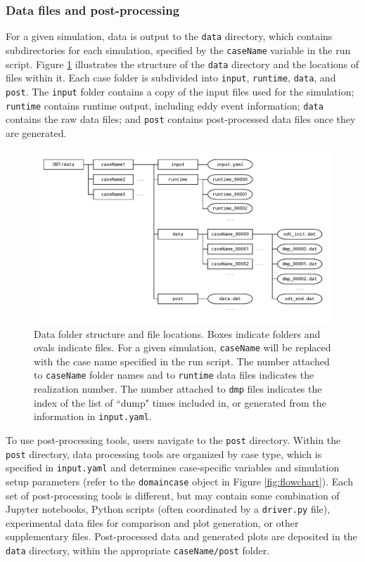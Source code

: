 \documentclass[preprint,12pt, a4paper]{elsarticle}
\begin{document}
\subsubsection{Data files and post-processing}
\label{sec:data_files_post_processing}

For a given simulation, data is output to the \texttt{data} directory, which contains subdirectories for each simulation, specified by the \texttt{caseName} variable in the run script. Figure \ref{fig:data_folder_structure} illustrates the structure of the \texttt{data} directory and the locations of files within it. Each case folder is subdivided into \texttt{input}, \texttt{runtime}, \texttt{data}, and \texttt{post}. The \texttt{input} folder contains a copy of the input files used for the simulation; \texttt{runtime} contains runtime output, including eddy event information; \texttt{data} contains the raw data files; and \texttt{post} contains post-processed data files once they are generated. 

\begin{figure}
	\centering
    \includegraphics[width=\textwidth]{fig_data_folder_structure.pdf} 
	\caption{Data folder structure and file locations. Boxes indicate folders and ovals indicate files. For a given simulation, \texttt{caseName} will be replaced with the case name specified in the run script. The number attached to \texttt{caseName} folder names and to \texttt{runtime} data files indicates the realization number. The number attached to \texttt{dmp} files indicates the index of the list of ``dump" times included in, or generated from the information in \texttt{input.yaml}.}
\label{fig:data_folder_structure}
\end{figure}

To use post-processing tools, users navigate to the \texttt{post} directory. Within the \texttt{post} directory, data processing tools are organized by case type, which is specified in \texttt{input.yaml} and determines case-specific variables and simulation setup parameters (refer to the \texttt{domaincase} object in Figure \ref{fig:flowchart}). Each set of post-processing tools is different, but may contain some combination of Jupyter notebooks, Python scripts (often coordinated by a \texttt{driver.py} file), experimental data files for comparison and plot generation, or other supplementary files. Post-processed data and generated plots are deposited in the \texttt{data} directory, within the appropriate \texttt{caseName/post} folder.  
\end{document}
